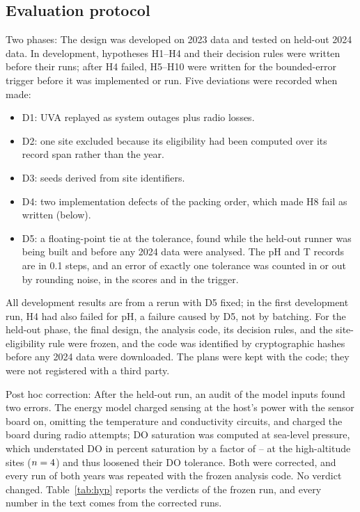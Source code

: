 \subsection{Evaluation protocol}
\label{sec:des-protocol}
Two phases: The design was developed on 2023 data and tested on held-out 2024 data. In development, hypotheses H1--H4 and their decision rules were written before their runs; after H4 failed, H5--H10 were written for the bounded-error trigger before it was implemented or run. Five deviations were recorded when made:
\begin{itemize}
\item D1: UVA replayed as system outages plus radio losses.
\item D2: one site excluded because its eligibility had been computed over its record span rather than the year.
\item D3: seeds derived from site identifiers.
\item D4: two implementation defects of the packing order, which made H8 fail as written (below).
\item D5: a floating-point tie at the tolerance, found while the held-out runner was being built and before any 2024 data were analysed. The pH and T records are in 0.1 steps, and an error of exactly one tolerance was counted in or out by rounding noise, in the scores and in the trigger.
\end{itemize}
All development results are from a rerun with D5 fixed; in the first development run, H4 had also failed for pH, a failure caused by D5, not by batching. For the held-out phase, the final design, the analysis code, its decision rules, and the site-eligibility rule were frozen, and the code was identified by cryptographic hashes before any 2024 data were downloaded. The plans were kept with the code; they were not registered with a third party.

Post hoc correction: After the held-out run, an audit of the model inputs found two errors. The energy model charged sensing at the host's power with the sensor board on, omitting the temperature and conductivity circuits, and charged the board during radio attempts; DO saturation was computed at sea-level pressure, which understated DO in percent saturation by a factor of \doAltFactorMin--\doAltFactorMax{} at the high-altitude sites ($n=4$) and thus loosened their DO tolerance. Both were corrected, and every run of both years was repeated with the frozen analysis code. No verdict changed. Table~\ref{tab:hyp} reports the verdicts of the frozen run, and every number in the text comes from the corrected runs.

